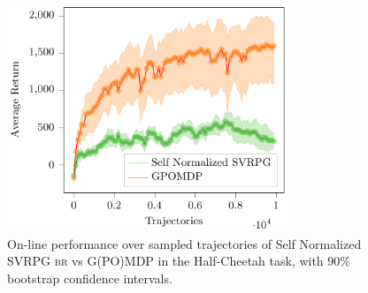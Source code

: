 \begin{figure}[h]
	\begin{minipage}[h]{1\textwidth}
		\centering
		\includegraphics[width=0.75\textwidth]{Images/Experiments/half_cheetah_GPOMDP_vs_SN_SVRPG_B_reuse.pdf}
		\vspace{-0.1in}
		\caption{On-line performance over sampled trajectories of Self Normalized \acs{SVRPG} \textsc{br} vs G(PO)MDP in the Half-Cheetah task, with 90\% bootstrap confidence intervals.}
		\label{fig:hcten}
	\end{minipage}
	\vspace{-0.15in}
\end{figure}


